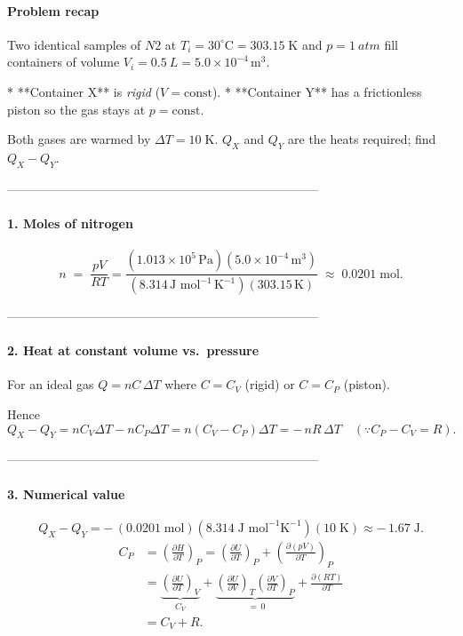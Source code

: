 \documentclass[12pt]{article}
\theoremstyle{definition} %
\theoremstyle{plain} %
\begin{document}
\paragraph{Problem recap}
Two identical samples of \({N2}\) at 
\(T_i = 30^{\circ}\text{C}=303.15\;\text{K}\) and \(p=\SI{1}{atm}\)  
fill containers of volume \(V_i=\SI{0.5}{L}=5.0\times10^{-4}\,\text{m}^3\).

* **Container X** is \emph{rigid} (\(V=\text{const}\)).
* **Container Y** has a frictionless piston so the gas stays at \(p=\text{const}\).

Both gases are warmed by \(\Delta T = 10\;\text{K}\).  
\(Q_X\) and \(Q_Y\) are the heats required; find \(Q_X-Q_Y\).

---------------------------------------------------------------------------
\paragraph{1.  Moles of nitrogen}
\[
  n \;=\; \frac{pV}{RT}
        = \frac{(1.013\times10^{5}\,\text{Pa})(5.0\times10^{-4}\,\text{m}^3)}
               {(8.314\,\text{J mol}^{-1}\,\text{K}^{-1})(303.15\,\text{K})}
        \;\approx\; 0.0201\;\text{mol}.
\]

---------------------------------------------------------------------------
\paragraph{2.  Heat at constant volume vs.\ pressure}
For an ideal gas  
\(Q = nC\,\Delta T\) where \(C=C_V\) (rigid) or \(C=C_P\) (piston).

Hence
\[
  Q_X - Q_Y
  = nC_V\Delta T - nC_P\Delta T
  = n(C_V-C_P)\Delta T
  = -\,nR\,\Delta T
  \quad(\because C_P - C_V = R).
\]

---------------------------------------------------------------------------
\paragraph{3.  Numerical value}
\[
  Q_X - Q_Y
  = -\,(0.0201\;\text{mol})(8.314\;\text{J mol}^{-1}\text{K}^{-1})(10\;\text{K})
  \approx \boxed{-\,1.67\;\text{J}}.
\]
\[
\begin{aligned}
C_P
  &= \left(\frac{\partial H}{\partial T}\right)_P
   = \left(\frac{\partial U}{\partial T}\right)_P
     + \left(\frac{\partial (pV)}{\partial T}\right)_P \\[6pt]
  &= \underbrace{\left(\frac{\partial U}{\partial T}\right)_V}_{C_V}
     + \underbrace{\left(\frac{\partial U}{\partial V}\right)_T
                    \left(\frac{\partial V}{\partial T}\right)_P}_{\;=\,0}
     + \frac{\partial (RT)}{\partial T} \\[6pt]
  &= C_V + R .
\end{aligned}
\]
\end{document}
